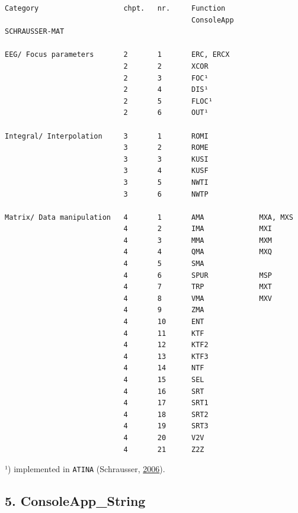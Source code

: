 \documentclass[
]{article}
\begin{document}
\begin{verbatim}
Category                    chpt.   nr.     Function    
                                            ConsoleApp      SCHRAUSSER-MAT

EEG/ Focus parameters       2       1       ERC, ERCX   
                            2       2       XCOR    
                            2       3       FOC¹    
                            2       4       DIS¹    
                            2       5       FLOC¹   
                            2       6       OUT¹    

Integral/ Interpolation     3       1       ROMI    
                            3       2       ROME    
                            3       3       KUSI    
                            3       4       KUSF    
                            3       5       NWTI    
                            3       6       NWTP    

Matrix/ Data manipulation   4       1       AMA             MXA, MXS
                            4       2       IMA             MXI
                            4       3       MMA             MXM
                            4       4       QMA             MXQ
                            4       5       SMA 
                            4       6       SPUR            MSP
                            4       7       TRP             MXT
                            4       8       VMA             MXV
                            4       9       ZMA 
                            4       10      ENT 
                            4       11      KTF 
                            4       12      KTF2    
                            4       13      KTF3    
                            4       14      NTF 
                            4       15      SEL 
                            4       16      SRT 
                            4       17      SRT1    
                            4       18      SRT2    
                            4       19      SRT3    
                            4       20      V2V 
                            4       21      Z2Z      
\end{verbatim}

¹) implemented in \texttt{ATINA} (Schrausser,
\href{https://doi.org/10.5281/zenodo.19422127}{2006}).

\hypertarget{consoleapp_string}{%
\subsection{5. ConsoleApp\_String}\label{consoleapp_string}}
\end{document}
